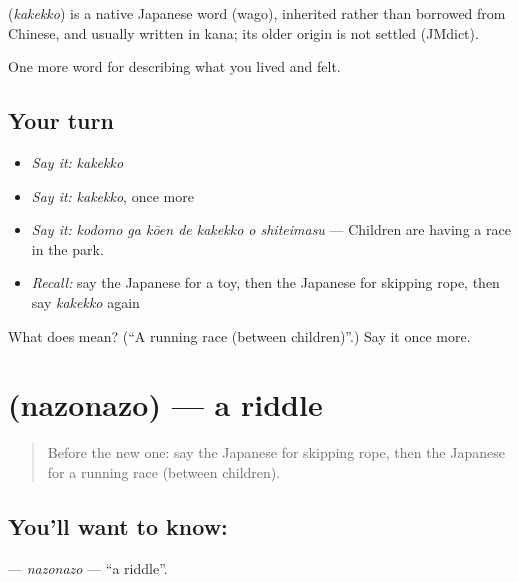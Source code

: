 \begin{cousinweb}
\textbf{} (\emph{kakekko}) is a native Japanese word (wago), inherited rather than borrowed from Chinese, and usually written in kana; its older origin is not settled (JMdict).
\end{cousinweb}

\begin{grammarlens}[title={What you've built}]
One more word for describing what you lived and felt.
\end{grammarlens}

\subsection*{Your turn}
\begin{itemize}
\raggedright
  \item \emph{Say it:} \emph{kakekko}
  \item \emph{Say it:} \emph{kakekko}, once more
  \item \emph{Say it:} \emph{kodomo ga kōen de kakekko o shiteimasu} — Children are having a race in the park.
  \item \emph{Recall:} say the Japanese for a toy, then the Japanese for skipping rope, then say \emph{kakekko} again
\end{itemize}

\begin{tcolorbox}[breakable,colback=teal!4,colframe=teal!35!black,title={Before you move on}]
What does  mean? (\textquotedblleft{}A running race (between children)\textquotedblright{}.) Say it once more.
\end{tcolorbox}
\section[\texorpdfstring{\ja{なぞなぞ} (nazonazo)}{なぞなぞ (nazonazo)}]{ (nazonazo) — a riddle}

\label{lesson:JA-C500-nazonazo}



\begin{quote}
Before the new one: say the Japanese for skipping rope, then the Japanese for a running race (between children).
\end{quote}

\subsection*{You'll want to know: }
\textbf{} — \emph{nazonazo} — \textquotedblleft{}a riddle\textquotedblright{}.

